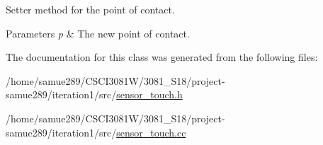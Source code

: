 Setter method for the point of contact. 


\begin{DoxyParams}{Parameters}
{\em p} & The new point of contact. \\
\hline
\end{DoxyParams}


The documentation for this class was generated from the following files\+:\begin{DoxyCompactItemize}
\item 
/home/samue289/\+C\+S\+C\+I3081\+W/3081\+\_\+\+S18/project-\/samue289/iteration1/src/\hyperlink{sensor__touch_8h}{sensor\+\_\+touch.\+h}\item 
/home/samue289/\+C\+S\+C\+I3081\+W/3081\+\_\+\+S18/project-\/samue289/iteration1/src/\hyperlink{sensor__touch_8cc}{sensor\+\_\+touch.\+cc}\end{DoxyCompactItemize}
